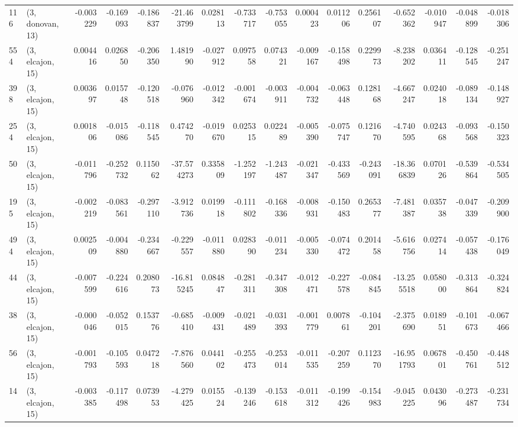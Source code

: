 \begin{tabular}{llrrrrrrrrrrrrrr}
116 &  (3, donovan, 13) &  -0.003229 & -0.169093 & -0.186837 &  -21.463799 &  0.028113 &  -0.733717 & -0.753055 &  0.000423 &  0.011206 &  0.256107 &   -0.652362 & -0.010947 & -0.048899 & -0.018306 \\
554 &  (3, elcajon, 15) &   0.004416 &  0.026850 & -0.206350 &    1.481990 & -0.027912 &   0.097558 &  0.074321 & -0.009167 & -0.158498 &  0.229973 &   -8.238202 &  0.036411 & -0.128545 & -0.251247 \\
398 &  (3, elcajon, 15) &   0.003697 &  0.015748 & -0.120518 &   -0.076960 & -0.012342 &  -0.001674 & -0.003911 & -0.004732 & -0.063448 &  0.128168 &   -4.667247 &  0.024018 & -0.089134 & -0.148927 \\
254 &  (3, elcajon, 15) &   0.001806 & -0.015086 & -0.118545 &    0.474270 & -0.019670 &   0.025315 &  0.022489 & -0.005390 & -0.075747 &  0.121670 &   -4.740595 &  0.024368 & -0.093568 & -0.150323 \\
50  &  (3, elcajon, 15) &  -0.011796 & -0.252732 &  0.115062 &  -37.574273 &  0.335809 &  -1.252197 & -1.243487 & -0.021347 & -0.433569 & -0.243091 &  -18.366839 &  0.070126 & -0.539864 & -0.534505 \\
195 &  (3, elcajon, 15) &  -0.002219 & -0.083561 & -0.297110 &   -3.912736 &  0.019918 &  -0.111802 & -0.168336 & -0.008931 & -0.150483 &  0.265377 &   -7.481387 &  0.035738 & -0.047339 & -0.209900 \\
494 &  (3, elcajon, 15) &   0.002509 & -0.004880 & -0.234667 &   -0.229557 & -0.011880 &   0.028390 & -0.011234 & -0.005330 & -0.074472 &  0.201458 &   -5.616756 &  0.027414 & -0.057438 & -0.176049 \\
44  &  (3, elcajon, 15) &  -0.007599 & -0.224616 &  0.208073 &  -16.815245 &  0.084847 &  -0.281311 & -0.347308 & -0.012471 & -0.227578 & -0.084845 &  -13.255518 &  0.058000 & -0.313864 & -0.324824 \\
38  &  (3, elcajon, 15) &  -0.000046 & -0.052015 &  0.153776 &   -0.685410 & -0.009431 &  -0.021489 & -0.031393 & -0.001779 &  0.007861 & -0.104201 &   -2.375690 &  0.018951 & -0.101673 & -0.067466 \\
56  &  (3, elcajon, 15) &  -0.001793 & -0.105593 &  0.047218 &   -7.876560 &  0.044102 &  -0.255473 & -0.253014 & -0.011535 & -0.207259 &  0.112370 &  -16.951793 &  0.067801 & -0.450761 & -0.448512 \\
14  &  (3, elcajon, 15) &  -0.003385 & -0.117498 &  0.073953 &   -4.279425 &  0.015524 &  -0.139246 & -0.153618 & -0.011312 & -0.199426 & -0.154983 &   -9.045225 &  0.043096 & -0.273487 & -0.231734 \\

\end{tabular}
